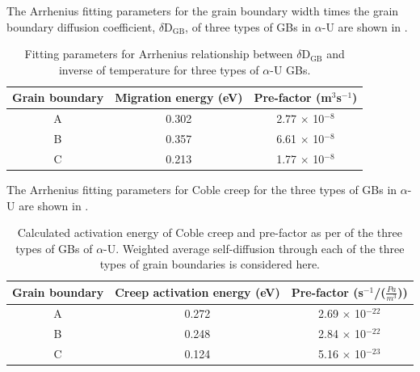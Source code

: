 \documentclass[review]{elsarticle}
\begin{document}
The Arrhenius fitting parameters for the grain boundary width times the grain boundary diffusion coefficient, $\delta$D$_\mathrm{GB}$, of three types of GBs in $\alpha$-U are shown in .

\begin{table}[h!]
\centering
\caption{ Fitting parameters for Arrhenius relationship between $\delta$D$_\mathrm{GB}$ and inverse of temperature for three types of $\alpha$-U GBs. \label{tab:widthanddiff}}
\begin{tabular}{|c|c|c|}
\hline
\multicolumn{1}{|c}{Grain boundary}
& \multicolumn{1}{|c}{Migration energy (eV) } & \multicolumn{1}{c|}{Pre-factor (m$^{3}$s$^{-1}$) } \\
\hline

A & 0.302 & 2.77 $\times$ 10$^{-8}$ \\
B & 0.357 & 6.61 $\times$ 10$^{-8}$ \\
C & 0.213 & 1.77 $\times$ 10$^{-8}$ \\

\hline
\end{tabular}
\end{table}


The Arrhenius fitting parameters for Coble creep for the three types of GBs in $\alpha$-U are shown in .
\begin{table}[h!]
\centering
\caption{Calculated activation energy of Coble creep and pre-factor as per  of the three types of GBs of $\alpha$-U. Weighted average self-diffusion through each of the three types of grain boundaries is considered here. \label{tab:creep}}
\begin{tabular}{|c|c|c|}
\hline
\multicolumn{1}{|c}{Grain boundary}
& \multicolumn{1}{|c}{Creep activation energy (eV) } & \multicolumn{1}{c|}{Pre-factor (s$^{-1}$/($\frac{Pa}{m^3}$)) } \\
\hline

A & 0.272 & 2.69 $\times$ 10$^{-22}$ \\
B & 0.248 & 2.84 $\times$ 10$^{-22}$ \\
C & 0.124 & 5.16 $\times$ 10$^{-23}$ \\

\hline
\end{tabular}
\end{table}


\setlength{\arrayrulewidth}{.5mm}
\setlength{\tabcolsep}{12pt}
\renewcommand{\arraystretch}{1.0}



\newpage


\end{document}

